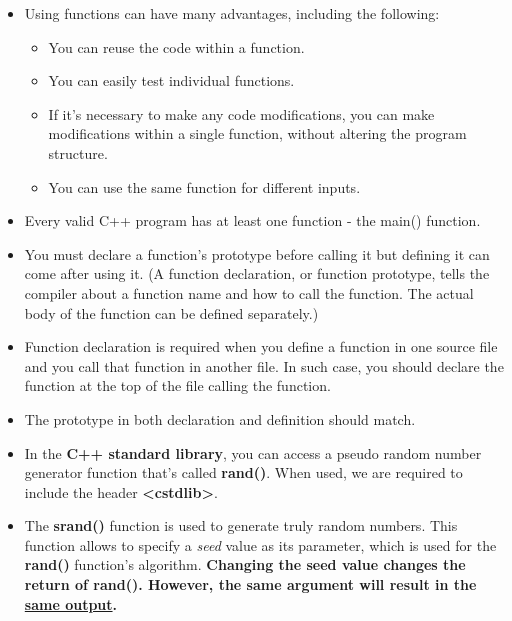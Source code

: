 \documentclass[12pt , a4paper]{article}
\newcommand{\hl}[1]{\colorbox{coolblack}{\color{cream}\textbf{#1}\color{black}}}
\begin{document}
		\begin{itemize}
			\item Using functions can have many advantages, including the following: \\
			\begin{itemize}
				\item  You can reuse the code within a function.\\
				\item You can easily test individual functions.\\
				\item  If it's necessary to make any code modifications, you can make modifications within a single function, without altering the program structure.\\
				\item   You can use the same function for different inputs.\\
			\end{itemize}
			\item Every valid C++ program has at least one function - the main() function.\\
			\item You must declare a function's prototype before calling it but defining it can come after using it. (A function declaration, or function prototype, tells the compiler about a function name and how to call the function. The actual body of the function can be defined separately.)\\
			\item Function declaration is required when you define a function in one source file and you call that function in another file. In such case, you should declare the function at the top of the file calling the function.\\
			\item The prototype in both declaration and definition should match.\\
			\item In the \textbf{C++ standard library}, you can access a pseudo random number generator function that's called \hl{rand()}. When used, we are required to include the header \hl{<cstdlib>}.\label{Functions_random_generator}	\\
			\item The \hl{srand()} function is used to generate truly random numbers. This function allows to specify a \textit{seed} value as its parameter, which is used for the \hl{rand()} function's algorithm. \textbf{Changing the seed value changes the return of rand(). However, the same argument will result in the \underline{same output}.} 	\label{Functions_random_generator_with_seed}\\

\end{itemize}
\end{document}
